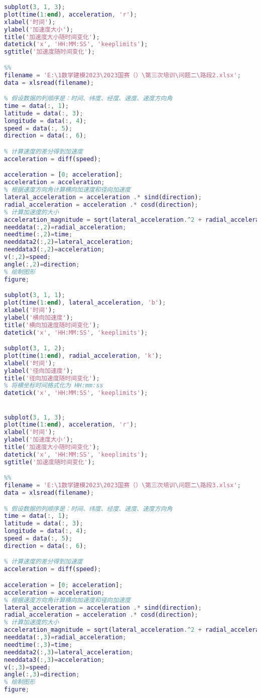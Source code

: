 \documentclass[withoutpreface,bwprint]{cumcmthesis} %
\begin{document}
\begin{appendices}
\begin{lstlisting}[language=matlab]
subplot(3, 1, 3);
plot(time(1:end), acceleration, 'r');
xlabel('时间');
ylabel('加速度大小');
title('加速度大小随时间变化');
datetick('x', 'HH:MM:SS', 'keeplimits');
sgtitle('加速度随时间变化');

%%
filename = 'E:\1数学建模2023\2023国赛（）\第三次培训\问题二\路段2.xlsx';
data = xlsread(filename);

% 假设数据的列顺序是：时间、纬度、经度、速度、速度方向角
time = data(:, 1);
latitude = data(:, 3);
longitude = data(:, 4);
speed = data(:, 5);
direction = data(:, 6);

% 计算速度的差分得到加速度
acceleration = diff(speed);

acceleration = [0; acceleration];
acceleration = acceleration;
% 根据速度方向角计算横向加速度和径向加速度
lateral_acceleration = acceleration .* sind(direction);
radial_acceleration = acceleration .* cosd(direction);
% 计算加速度的大小
acceleration_magnitude = sqrt(lateral_acceleration.^2 + radial_acceleration.^2);
needdata(:,2)=radial_acceleration;
needtime(:,2)=time;
needdata2(:,2)=lateral_acceleration;
needdata3(:,2)=acceleration;
v(:,2)=speed;
angle(:,2)=direction;
% 绘制图形
figure;

subplot(3, 1, 1);
plot(time(1:end), lateral_acceleration, 'b');
xlabel('时间');
ylabel('横向加速度');
title('横向加速度随时间变化');
datetick('x', 'HH:MM:SS', 'keeplimits');

subplot(3, 1, 2);
plot(time(1:end), radial_acceleration, 'k');
xlabel('时间');
ylabel('径向加速度');
title('径向加速度随时间变化');
% 将横坐标时间格式化为 HH:mm:ss
datetick('x', 'HH:MM:SS', 'keeplimits');


subplot(3, 1, 3);
plot(time(1:end), acceleration, 'r');
xlabel('时间');
ylabel('加速度大小');
title('加速度大小随时间变化');
datetick('x', 'HH:MM:SS', 'keeplimits');
sgtitle('加速度随时间变化');

%%
filename = 'E:\1数学建模2023\2023国赛（）\第三次培训\问题二\路段3.xlsx';
data = xlsread(filename);

% 假设数据的列顺序是：时间、纬度、经度、速度、速度方向角
time = data(:, 1);
latitude = data(:, 3);
longitude = data(:, 4);
speed = data(:, 5);
direction = data(:, 6);

% 计算速度的差分得到加速度
acceleration = diff(speed);

acceleration = [0; acceleration];
acceleration = acceleration;
% 根据速度方向角计算横向加速度和径向加速度
lateral_acceleration = acceleration .* sind(direction);
radial_acceleration = acceleration .* cosd(direction);
% 计算加速度的大小
acceleration_magnitude = sqrt(lateral_acceleration.^2 + radial_acceleration.^2);
needdata(:,3)=radial_acceleration;
needtime(:,3)=time;
needdata2(:,3)=lateral_acceleration;
needdata3(:,3)=acceleration;
v(:,3)=speed;
angle(:,3)=direction;
% 绘制图形
figure;


\end{lstlisting}
\end{appendices}
\end{document}
